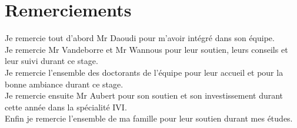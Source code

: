 \documentclass[a4paper,11pt]{article}
\begin{document}
\newpage




\section*{Remerciements}
Je remercie tout d'abord Mr Daoudi pour m'avoir intégré dans son équipe.\\

Je remercie Mr Vandeborre et Mr Wannous pour leur soutien, leurs conseils et leur suivi durant ce stage.\\

Je remercie l'ensemble des doctorants de l'équipe pour leur accueil et pour la bonne ambiance durant ce stage.\\ 

Je remercie ensuite Mr Aubert pour son soutien et son investissement durant cette année dans la spécialité IVI.\\

Enfin je remercie l'ensemble de ma famille pour leur soutien durant mes études.
\newpage
\end{document}
